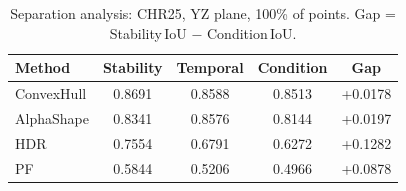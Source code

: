 \begin{table}[ht]
\centering
\small
\caption{Separation analysis: CHR25, YZ plane, 100\% of points. Gap = Stability\,IoU $-$ Condition\,IoU.}
\label{tab:sep_chr25}
\begin{tabular}{lcccc}
\toprule
Method & Stability & Temporal & Condition & Gap \\
\midrule
ConvexHull & 0.8691 & 0.8588 & 0.8513 & +0.0178 \\
AlphaShape & 0.8341 & 0.8576 & 0.8144 & +0.0197 \\
HDR & 0.7554 & 0.6791 & 0.6272 & +0.1282 \\
PF & 0.5844 & 0.5206 & 0.4966 & +0.0878 \\
\bottomrule
\end{tabular}
\end{table}